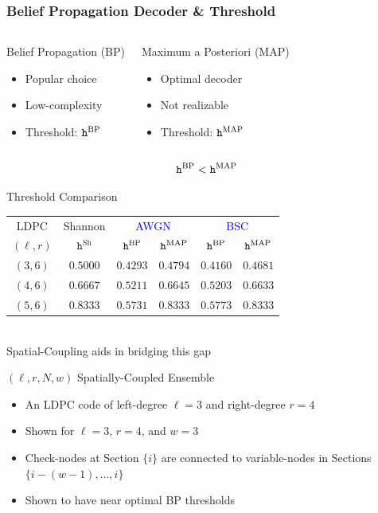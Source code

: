 \documentclass[10pt,presentation]{beamer}
\begin{document}
\begin{frame}\frametitle{Belief Propagation Decoder \& Threshold}
\hspace*{10pt}
\begin{columns}
\begin{defn}{Belief Propagation (BP)}
\begin{itemize}
\item Popular choice
\item Low-complexity
\item Threshold: $\texttt{h}^{\mathrm{BP}}$
\end{itemize}
\end{defn}
\begin{defn}{Maximum a Posteriori (MAP)}
\begin{itemize}
\item Optimal decoder
\item \alert{Not realizable}
\item Threshold: $\texttt{h}^{\mathrm{MAP}}$
\end{itemize}
\end{defn}
\end{columns}
{\Large \textcolor{blue}{
\begin{align*}
  \texttt{h}^{\mathrm{BP}} < \texttt{h}^{\mathrm{MAP}}
\end{align*}
}}
\end{frame}

\begin{frame}{Threshold Comparison}
\centering
\begin{tabular}{|c|c|c|c|c|c|}
  \hline
  LDPC & Shannon & \multicolumn{2}{|c|}{\textcolor{blue}{AWGN}} & \multicolumn{2}{|c|}{\textcolor{blue}{BSC}} \\
  \cline{3-6}
  $(\ell,r)$ & $\texttt{h}^{\mathrm{Sh}}$ & $\texttt{h}^{\mathrm{BP}}$ & $\texttt{h}^{\mathrm{MAP}}$ & $\texttt{h}^{\mathrm{BP}}$ & $\texttt{h}^{\mathrm{MAP}}$ \\
  \hline
  $(3,6)$ & $0.5000$ & $0.4293$ & $0.4794$ & $0.4160$ & $0.4681$ \\
  $(4,6)$ & $0.6667$ & $0.5211$ & $0.6645$ & $0.5203$ & $0.6633$ \\
  $(5,6)$ & $0.8333$ & $0.5731$ & $0.8333$ & $0.5773$ & $0.8333$ \\
  \hline
\end{tabular}
\\
\vspace{5mm}
\alert{Spatial-Coupling aids in bridging this gap}
\end{frame}

\begin{frame}{$(\ell,r,N,w)$ Spatially-Coupled Ensemble}
  \scalebox{0.9}{}
  \begin{itemize}
  \item<1> An LDPC code of left-degree $\ell=3$ and right-degree $r=4$
  \item<3-> Shown for $\ell = 3$, $r = 4$, and $w=3$
  \item<3-> Check-nodes at Section $\{i\}$ are connected to variable-nodes in Sections $\{i-(w-1),\dots,i\}$
  \item<3-> Shown to have {\blue near optimal BP thresholds}
  \end{itemize}
\end{frame}
\end{document}
